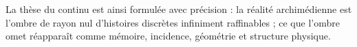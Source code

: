 {La thèse du continu est ainsi formulée avec précision : la réalité
archimédienne est l'ombre de rayon nul d'histoires discrètes infiniment
raffinables ; ce que l'ombre omet réapparaît comme mémoire, incidence,
géométrie et structure physique.

\begin{HMTScientificOwnerSubordinated}

\end{HMTScientificOwnerSubordinated}
}
